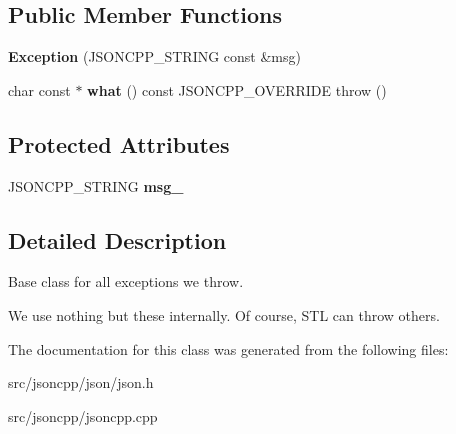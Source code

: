 \subsection*{Public Member Functions}
\begin{DoxyCompactItemize}
\item 
{\bfseries Exception} (J\+S\+O\+N\+C\+P\+P\+\_\+\+S\+T\+R\+I\+NG const \&msg)\hypertarget{classJson_1_1Exception_ae764aa42e0755bd4ce9d303e2733fa8f}{}\label{classJson_1_1Exception_ae764aa42e0755bd4ce9d303e2733fa8f}

\item 
char const $\ast$ {\bfseries what} () const J\+S\+O\+N\+C\+P\+P\+\_\+\+O\+V\+E\+R\+R\+I\+DE  throw ()\hypertarget{classJson_1_1Exception_a5a9ed7d91b828b9be81706ef9d483ed6}{}\label{classJson_1_1Exception_a5a9ed7d91b828b9be81706ef9d483ed6}

\end{DoxyCompactItemize}
\subsection*{Protected Attributes}
\begin{DoxyCompactItemize}
\item 
J\+S\+O\+N\+C\+P\+P\+\_\+\+S\+T\+R\+I\+NG {\bfseries msg\+\_\+}\hypertarget{classJson_1_1Exception_aae3cbb8b45bf21480f64502a8329659f}{}\label{classJson_1_1Exception_aae3cbb8b45bf21480f64502a8329659f}

\end{DoxyCompactItemize}


\subsection{Detailed Description}
Base class for all exceptions we throw.

We use nothing but these internally. Of course, S\+TL can throw others. 

The documentation for this class was generated from the following files\+:\begin{DoxyCompactItemize}
\item 
src/jsoncpp/json/json.\+h\item 
src/jsoncpp/jsoncpp.\+cpp\end{DoxyCompactItemize}

